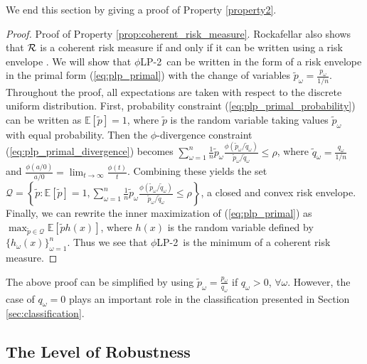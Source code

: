 \documentclass[ijoc,letterpaper]{informs3} %
\newcommand{\E}{\mathbb{E}}
\newcommand{\e}[1]{\E \left[ #1 \right]}
\newcommand{\plp}{$\phi$LP-2}
\begin{document}
We end this section by giving a proof of Property \ref{property2}. 


\begin{proof}{\sc Proof of Property \ref{prop:coherent_risk_measure}.}
	Rockafellar also shows that $\cal R$ is a coherent risk measure if and only if it can be written using a risk envelope \cite{rockafellar2007coherent}.
	We will show that \plp\ can be written in the form of a risk envelope in the primal form (\ref{eq:plp_primal}) with the change of variables $\tilde{p}_\omega = \frac{p_\omega}{1/n}$.
	Throughout the proof, all expectations are taken with respect to the discrete uniform distribution.
	First, probability constraint (\ref{eq:plp_primal_probability}) can be written as $\e{\tilde{p}} = 1$, where $\tilde{p}$ is the random variable taking values $\tilde{p}_\omega$ with equal probability.
	Then the $\phi$-divergence constraint (\ref{eq:plp_primal_divergence}) becomes $\sum_{\omega=1}^n \frac{1}{n} \tilde{p}_\omega \frac{\phi\left(\tilde{p}_\omega/\tilde{q}_\omega\right)}{\tilde{p}_\omega/\tilde{q}_\omega} \leq \rho$, where $\tilde{q}_\omega = \frac{q_\omega}{1/n}$ and $\frac{\phi(a/0)}{a/0} = \lim_{t \rightarrow \infty} \frac{\phi(t)}{t}$.
	Combining these yields the set $\mathcal{Q} = \left\{\tilde{p} : \e{\tilde{p}} = 1, \sum_{\omega=1}^n \frac{1}{n} \tilde{p}_\omega \frac{\phi\left(\tilde{p}_\omega/\tilde{q}_\omega\right)}{\tilde{p}_\omega/\tilde{q}_\omega} \leq \rho \right\}$, a closed and convex risk envelope.
	Finally, we can rewrite the inner maximization of (\ref{eq:plp_primal}) as $\max_{\tilde{p} \in \mathcal{Q}} \e{\tilde{p} h(x)}$, where $h(x)$ is the random variable defined by $\{h_\omega(x)\}_{\omega=1}^n$.
	Thus we see that \plp\ is the minimum of a coherent risk measure.
	\Halmos
\end{proof}

\begin{remark}
	The above proof can be simplified by using $\tilde{p}_\omega = \frac{p_\omega}{q_\omega}$ if $q_\omega > 0$, $\forall \omega$.
	However, the case of $q_\omega = 0$ plays an important role in the classification presented in Section \ref{sec:classification}.
\end{remark}



\subsection{The Level of Robustness}
\label{ssec:robust_level}
\end{document}
